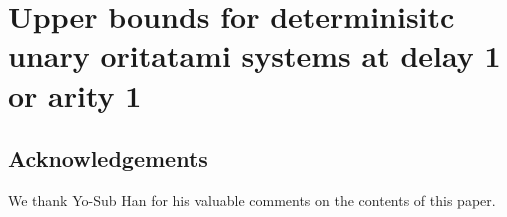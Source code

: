 \documentclass[runningheads]{llncs}
\begin{document}
\section{Upper bounds for determinisitc unary oritatami systems at delay 1 or arity 1}\label{sect:upper}







\subsection*{Acknowledgements}
We thank Yo-Sub Han for his valuable comments on the contents of this paper. 



  
\end{document}
